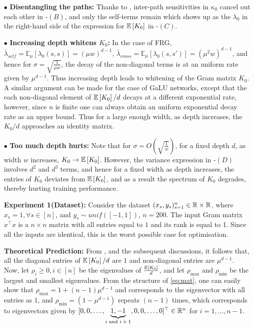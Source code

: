 $\bullet$ \textbf{Disentangling the paths:} Thanks to , inter-path sensitivities in $\kappa_0$ cancel out each other in -$(B)$, and only the self-terms remain which shows up as the $\lambda_0$ in the right-hand side of the expression for $\mathbb{E}\left[K_0\right]$ in -$(C)$.
 
$\bullet$ \textbf{Increasing depth whitens $K_0$:} In the case of FRG, $\bar{\lambda}_{self}=\mathbb{E}_{\mu}\left[\lambda_0(s,s)\right]=(\mu w)^{d-1}$, $\bar{\lambda}_{cross}=\mathbb{E}_{\mu}\left[\lambda_0(s,s')\right]= (\mu^2w)^{d-1}$, and hence for $\sigma=\sqrt{\frac{1}{\mu w}}$, the decay of the non-diagonal terms is at an uniform rate given by $\mu^{d-1}$. Thus increasing depth leads to whitening of the Gram matrix $K_0$. A similar argument can be made for the case of GaLU networks, except that the each non-diagonal element of $\mathbb{E}\left[K_0\right]/d$ decays at a different exponential rate, however, since $n$ is finite one can always obtain an uniform exponential decay rate as an upper bound. Thus for a large enough width, as depth increases, the $K_0/d$ approaches an identity matrix.

$\bullet$ \textbf{Too much depth hurts:} Note that for $\sigma=O\left(\sqrt{\frac{1}{w}}\right)$, for a fixed depth $d$, as width $w$ increases, $K_0\rightarrow\mathbb{E}\left[K_0\right]$. However, the variance expression in -$(D)$ involves $d^2$ and $d^3$ terms, and hence for a fixed width as depth increases, the entries of $K_0$ deviates from $\mathbb{E}\left[K_0\right]$, and as a result the spectrum of $K_0$ degrades, thereby hurting training performance.

\textbf{Experiment 1(Dataset):} Consider the dataset $(x_s,y_s)_{s=1}^n\in \mathbb{R}\times \mathbb{R}$, where $x_s=1,\forall s\in [n]$, and $y_s\sim unif([-1,1])$, $n=200$. The input Gram matrix $x^\top x$ is a $n\times n$ matrix with all entries equal to $1$ and its rank is equal to 1. Since all the inputs are identical, this is the worst possible case for optimisation.

\textbf{Theoretical Prediction:} From , and the subsequent discussions, it follows that, all the diagonal entries of $\mathbb{E}\left[K_0\right]/d$ are $1$ and non-diagonal entries are $\mu^{d-1}$. Now, let $\rho_i\geq 0,i \in [n]$ be the eigenvalues of $\frac{\mathbb{E}\left[K_0\right]}{d}$, and let $\rho_{\max}$ and $\rho_{\min}$ be the largest and smallest eigenvalues. From the structure of \eqref{eq:mat}, one can easily show that $\rho_{\max}=1+(n-1)\mu^{d-1}$ and corresponds to the eigenvector with all entries as $1$, and $\rho_{\min}=(1-\mu^{d-1})$ repeats $(n-1)$ times, which corresponds to eigenvectors given by $[0, 0, \ldots, \underbrace{1, -1}_{\text{$i$ and $i+1$}}, 0,0,\ldots, 0]^\top \in \mathbb{R}^n$ for $i=1,\ldots,n-1$.

